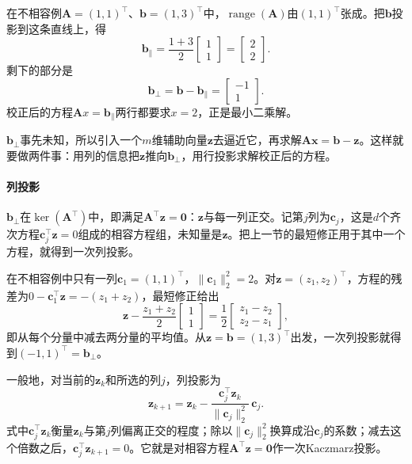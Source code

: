 在不相容例$\bm A=(1,1)^\top$、$\bm b=(1,3)^\top$中，$\operatorname{range}(\bm A)$由$(1,1)^\top$张成。把$\bm b$投影到这条直线上，得
\[
 \bm b_\parallel=\frac{1+3}{2}\begin{bmatrix}1\\1\end{bmatrix}=\begin{bmatrix}2\\2\end{bmatrix}.
\]
剩下的部分是
\[
 \bm b_\perp=\bm b-\bm b_\parallel=\begin{bmatrix}-1\\1\end{bmatrix}.
\]
校正后的方程$\bm A x=\bm b_\parallel$两行都要求$x=2$，正是最小二乘解。

$\bm b_\perp$事先未知，所以引入一个$m$维辅助向量$\bm z$去逼近它，再求解$\bm A\bm x=\bm b-\bm z$。这样就要做两件事：用列的信息把$\bm z$推向$\bm b_\perp$，用行投影求解校正后的方程。

\paragraph{列投影}
$\bm b_\perp$在$\ker(\bm A^\top)$中，即满足$\bm A^\top\bm z=\bm0$：$\bm z$与每一列正交。记第$j$列为$\bm c_j$，这是$d$个齐次方程$\bm c_j^\top\bm z=0$组成的相容方程组，未知量是$\bm z$。把上一节的最短修正用于其中一个方程，就得到一次列投影。

在不相容例中只有一列$\bm c_1=(1,1)^\top$，$\lVert\bm c_1\rVert_2^2=2$。对$\bm z=(z_1,z_2)^\top$，方程的残差为$0-\bm c_1^\top\bm z=-(z_1+z_2)$，最短修正给出
\[
 \bm z-\frac{z_1+z_2}{2}\begin{bmatrix}1\\1\end{bmatrix}
 =\frac12\begin{bmatrix}z_1-z_2\\z_2-z_1\end{bmatrix},
\]
即从每个分量中减去两分量的平均值。从$\bm z=\bm b=(1,3)^\top$出发，一次列投影就得到$(-1,1)^\top=\bm b_\perp$。

一般地，对当前的$\bm z_k$和所选的列$j$，列投影为
\begin{equation}
 \bm z_{k+1}=\bm z_k-\frac{\bm c_j^\top\bm z_k}{\lVert\bm c_j\rVert_2^2}\,\bm c_j .
 \label{eq:ls-extended-kaczmarz-column}
\end{equation}
式中$\bm c_j^\top\bm z_k$衡量$\bm z_k$与第$j$列偏离正交的程度；除以$\lVert\bm c_j\rVert_2^2$换算成沿$\bm c_j$的系数；减去这个倍数之后，$\bm c_j^\top\bm z_{k+1}=0$。它就是对相容方程$\bm A^\top\bm z=\bm0$作一次Kaczmarz投影。

